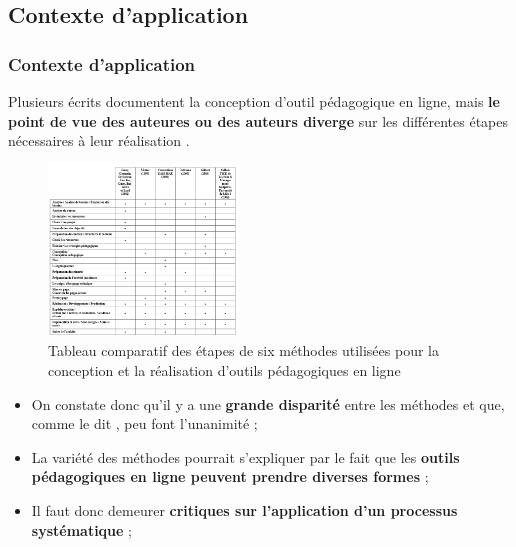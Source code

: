 \begin{frame}[allowframebreaks]
\begin{itemize}
\begin{itemize}
\begin{itemize}
                                    \end{itemize} 
                                  \end{itemize}                                             
                                \end{itemize} 
                        \end{frame}

  \subsection{Contexte d'application} 
		\begin{frame}[allowframebreaks]
			\frametitle{Contexte d'application}
			Plusieurs écrits documentent la conception d’outil pédagogique en ligne, mais\textbf{ le point de vue des auteures ou des auteurs diverge} sur les différentes étapes nécessaires à leur réalisation \citep[p.18]{bonneau2013a}.
                   \begin{figure}
                     \centering
                     \includegraphics[width = 0.45\textwidth]{tableau6methodes.png}
                     \caption{\tiny{Tableau comparatif des étapes de six méthodes utilisées pour la conception et la réalisation d’outils pédagogiques en ligne \citep[p.20]{bonneau2013a}}}
                   \end{figure}
                   \begin{itemize}                   
                   \item On constate donc qu’il y a une \textbf{grande disparité} entre les méthodes et que, comme le dit \citet{bonneau2013a}, peu font l’unanimité ;
                   \item La variété des méthodes pourrait s’expliquer par le fait que les \textbf{outils pédagogiques en ligne peuvent prendre diverses formes} ;
                   \item Il faut donc demeurer\textbf{ critiques sur l’application d’un processus systématique} ;

\end{itemize}
\end{frame}
